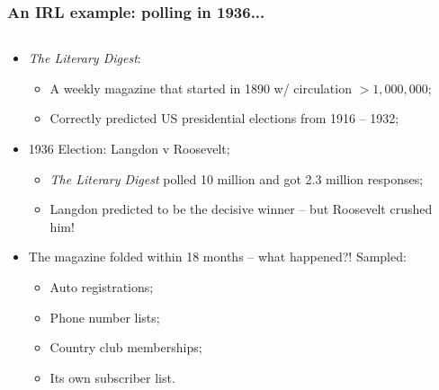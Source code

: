 \documentclass[aspectratio=169]{beamer}
\theoremstyle{principle}
\begin{document}
\begin{frame}
\frametitle{An IRL example: polling in 1936...}

\begin{columns}
\begin{column}{0.5\textwidth}

\begin{itemize}
\item \textit{The Literary Digest}:
\begin{itemize}
\item A weekly magazine that started in 1890 w/ circulation $> 1,000,000$;
\item Correctly predicted US presidential elections from 1916 -- 1932;
\end{itemize}

\item 1936 Election: Langdon v Roosevelt;
\begin{itemize}
\item \textit{The Literary Digest} polled 10 million and got 2.3 million responses;
\item Langdon predicted to be the decisive winner -- but Roosevelt crushed him!
\end{itemize}

\item The magazine folded within 18 months -- what happened?!  Sampled:
\begin{itemize}
\item Auto registrations;
\item Phone number lists;
\item Country club memberships;
\item Its own subscriber list.
\end{itemize}
\end{itemize}


\end{column}
\end{columns}
\end{frame}
\end{document}
